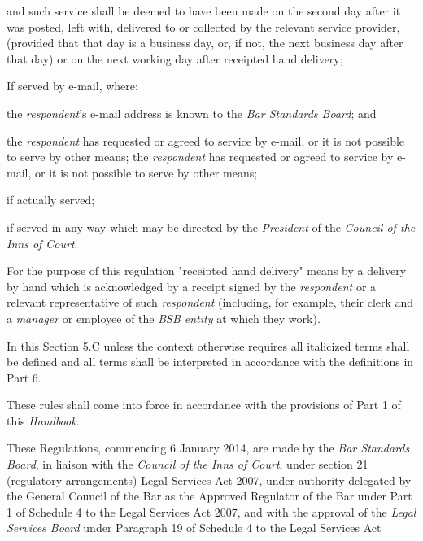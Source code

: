 and such service shall be deemed to have been made on the second day
after it was posted, left with, delivered to or collected by the
relevant service provider, (provided that that day is a business day,
or, if not, the next business day after that day) or on the next working
day after receipted hand delivery;\item If served by e-mail, where:\al
\item  the \emph{respondent}'s e-mail address is known to the \emph{Bar
Standards Board}; and\\
\item the \emph{respondent} has requested or agreed to service by e-mail,
or it is not possible to serve by other means;\la
the \emph{respondent} has requested or agreed to service by e-mail, or
it is not possible to serve by other means;\item if actually served;\item if served in any way which may be directed by the \emph{President} of
the \emph{Council of the Inns of Court}.\ln
{}\par
For the purpose of this regulation "receipted hand delivery" means by a
delivery by hand which is acknowledged by a receipt signed by
the \emph{respondent} or a relevant representative of
such \emph{respondent} (including, for example, their clerk and
a \emph{manager} or employee of the \emph{BSB entity} at which they
work).\\
\par
{}
In this Section 5.C unless the context otherwise requires all italicized
terms shall be defined and all terms shall be interpreted in accordance
with the definitions in Part 6.\\
\par
{}
These rules shall come into force in accordance with the provisions of
Part 1 of this \emph{Handbook}.\\
\par
These Regulations, commencing 6 January 2014, are made by the \emph{Bar
Standards Board}, in liaison with the \emph{Council of the Inns of
Court}, under section 21 (regulatory arrangements) Legal Services Act
2007, under authority delegated by the General Council of the Bar as the
Approved Regulator of the Bar under Part 1 of Schedule 4 to the Legal
Services Act 2007, and with the approval of the \emph{Legal Services
Board} under Paragraph 19 of Schedule 4 to the Legal Services Act
